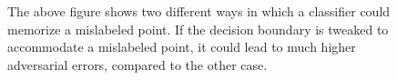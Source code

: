 \documentclass{ociamthesis}
\begin{document}
\begin{figure}[!h]
    \centering
    \qquad
    \caption{The above figure shows two different ways in which a classifier
    could memorize a mislabeled point. If the decision boundary is tweaked to
    accommodate a mislabeled point, it could lead to much higher adversarial
    errors, compared to the other case.}
    \label{fig:pockets-or-tweaks}

\end{figure}
\end{document}
